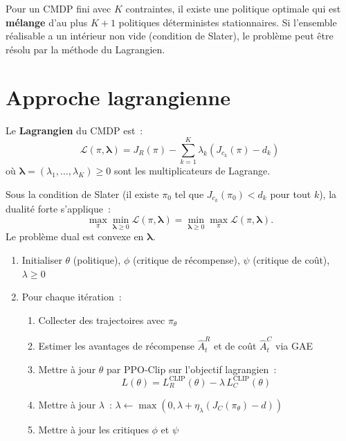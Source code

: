 \begin{theoreme}
Pour un CMDP fini avec $K$ contraintes, il existe une politique optimale
qui est \textbf{m\'elange} d'au plus $K+1$ politiques d\'eterministes
stationnaires. Si l'ensemble r\'ealisable a un int\'erieur non vide (condition
de Slater), le probl\`eme peut \^etre r\'esolu par la m\'ethode du Lagrangien.
\end{theoreme}

\section{Approche lagrangienne}

\begin{definition}
Le \textbf{Lagrangien} du CMDP est~:
\[
    \mathcal{L}(\pi, \boldsymbol{\lambda}) = J_R(\pi)
    - \sum_{k=1}^K \lambda_k \left(J_{c_k}(\pi) - d_k\right)
\]
o\`u $\boldsymbol{\lambda} = (\lambda_1, \ldots, \lambda_K) \geq 0$ sont les
multiplicateurs de Lagrange.
\end{definition}

\begin{theoreme}
Sous la condition de Slater (il existe $\pi_0$ tel que $J_{c_k}(\pi_0) < d_k$
pour tout $k$), la dualit\'e forte s'applique~:
\[
    \max_\pi \min_{\boldsymbol{\lambda} \geq 0} \mathcal{L}(\pi, \boldsymbol{\lambda})
    = \min_{\boldsymbol{\lambda} \geq 0} \max_\pi \mathcal{L}(\pi, \boldsymbol{\lambda}).
\]
Le probl\`eme dual est convexe en $\boldsymbol{\lambda}$.
\end{theoreme}

\begin{algorithme}[title=\textbf{PPO-Lagrangien}]
\begin{enumerate}
    \item Initialiser $\theta$ (politique), $\phi$ (critique de r\'ecompense),
    $\psi$ (critique de co\^ut), $\lambda \geq 0$
    \item Pour chaque it\'eration~:
    \begin{enumerate}
        \item Collecter des trajectoires avec $\pi_\theta$
        \item Estimer les avantages de r\'ecompense $\hat{A}_t^R$ et de co\^ut $\hat{A}_t^C$ via GAE
        \item Mettre \`a jour $\theta$ par PPO-Clip sur l'objectif lagrangien~:
        \[
            L(\theta) = L_R^{\text{CLIP}}(\theta)
            - \lambda \, L_C^{\text{CLIP}}(\theta)
        \]
        \item Mettre \`a jour $\lambda$~:
        $\lambda \leftarrow \max(0, \lambda + \eta_\lambda(J_C(\pi_\theta) - d))$
        \item Mettre \`a jour les critiques $\phi$ et $\psi$
    \end{enumerate}
\end{enumerate}
\end{algorithme}

